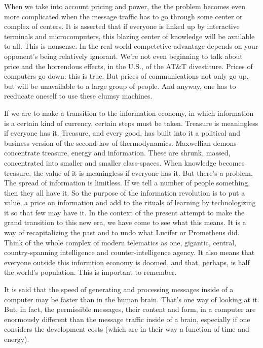 \documentclass[11pt,twoside,draft]{memoir}
\begin{document}
When we take into account pricing and
power, the the problem becomes even more
complicated when the message traffic has to
go through some center or complex of centers. It is asserted that if everyone is linked
up by interactive terminals and microcomputers, this blazing center of knowledge will
be available to all. This is nonsense. In the
real world competetive advantage depends
on your opponent's being relatively ignorant. We're not even beginning to talk about
price and the horrendous effects, in the U.S.,
of the AT\&T divestiture. Prices of computers
go down: this is true. But prices of communications not only go up, but will be unavailable to a large group of people. And anyway,
one has to reeducate oneself to use these
clumsy machines.

If we are to make a transition to the information economy, in which information is a
certain kind of currency, certain steps must
be taken. Treasure is meaningless if everyone has it. Treasure, and every good, has
built into it a political and business version
of the second law of thermodynamics. Maxwellian demons concentrate treasure, energy
and information. These are shrunk, massed,
concentrated into smaller and smaller class-spaces. When knowledge becomes treasure,
the value of it is meaningless if everyone has
it. But there's a problem. The spread of
information is limitless. If we tell a number
of people something, then they all have it. So
the purpose of the information revolution is
to put a value, a price on information and
add to the rituals of learning by technologizing it so that few may have it. In the context
of the present attempt to make the grand
transition to this new era, we have come to
see what this means. It is a way of recapitalizing the past and to undo what Lucifer or
Prometheus did. Think of the whole complex of modern telematics as one, gigantic,
central, country-spanning intelligence and
counter-intelligence agency. It also means
that everyone outside this informtion economy is doomed, and that, perhaps, is half the
world's population. This is important to remember.

It is said that the speed of generating and
processing messages inside of a computer
may be faster than in the human brain. That's
one way of looking at it. But, in fact, the
permissible messages, their content and
form, in a computer are enormously different than the message traffic inside of a
brain, especially if one considers the development costs (which are in their way a
function of time and energy).
\end{document}
